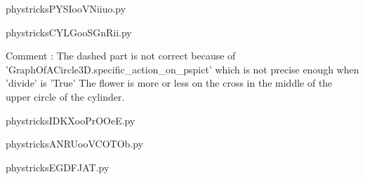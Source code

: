     \newcommand{\CaptionFigPYSIooVNiiuo}{<+Type your caption here+>}
    \begin{center}
        
    \end{center}
    phystricksPYSIooVNiiuo.py

    

    \clearpage
    


    \newcommand{\CaptionFigCYLGooSGnRii}{<+Type your caption here+>}
    \begin{center}
        
    \end{center}
    phystricksCYLGooSGnRii.py

    Comment : The dashed part is not correct because of 'GraphOfACircle3D.specific\_action\_on\_pspict' which is not precise enough when 'divide' is 'True'
 The flower is more or less on the cross in the middle of the upper circle of the cylinder.

    \clearpage
    


    \newcommand{\CaptionFigIDKXooPrOOeE}{<+Type your caption here+>}
    \begin{center}
        
    \end{center}
    phystricksIDKXooPrOOeE.py

    

    \clearpage
    


    \newcommand{\CaptionFigANRUooVCOTOb}{<+Type your caption here+>}
    \begin{center}
        
    \end{center}
    phystricksANRUooVCOTOb.py

    

    \clearpage
    


    \newcommand{\CaptionFigEGDFJAT}{<+Type your caption here+>}
    \begin{center}
        
    \end{center}
    phystricksEGDFJAT.py

    

    \clearpage
    

